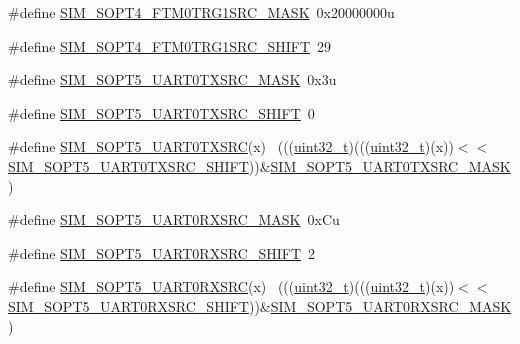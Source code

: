 \begin{DoxyCompactItemize}
\item 
\#define \hyperlink{group___s_i_m___register___masks_ga427b99978dda3f6bf1c0a97559315276}{S\+I\+M\+\_\+\+S\+O\+P\+T4\+\_\+\+F\+T\+M0\+T\+R\+G1\+S\+R\+C\+\_\+\+M\+A\+SK}~0x20000000u
\item 
\#define \hyperlink{group___s_i_m___register___masks_gacf67b2d7908669c38dfb06eff3c7fa8a}{S\+I\+M\+\_\+\+S\+O\+P\+T4\+\_\+\+F\+T\+M0\+T\+R\+G1\+S\+R\+C\+\_\+\+S\+H\+I\+FT}~29
\item 
\#define \hyperlink{group___s_i_m___register___masks_ga11646c1292cb7aab3128e1e563847e32}{S\+I\+M\+\_\+\+S\+O\+P\+T5\+\_\+\+U\+A\+R\+T0\+T\+X\+S\+R\+C\+\_\+\+M\+A\+SK}~0x3u
\item 
\#define \hyperlink{group___s_i_m___register___masks_ga0220b88df4a0747579d24b77f4db4e67}{S\+I\+M\+\_\+\+S\+O\+P\+T5\+\_\+\+U\+A\+R\+T0\+T\+X\+S\+R\+C\+\_\+\+S\+H\+I\+FT}~0
\item 
\#define \hyperlink{group___s_i_m___register___masks_gaae8f435ecf7230b287a09bcb1bad59e0}{S\+I\+M\+\_\+\+S\+O\+P\+T5\+\_\+\+U\+A\+R\+T0\+T\+X\+S\+RC}(x)                                ~(((\hyperlink{_p_e___types_8h_a33594304e786b158f3fb30289278f5af}{uint32\+\_\+t})(((\hyperlink{_p_e___types_8h_a33594304e786b158f3fb30289278f5af}{uint32\+\_\+t})(x))$<$$<$\hyperlink{group___s_i_m___register___masks_ga0220b88df4a0747579d24b77f4db4e67}{S\+I\+M\+\_\+\+S\+O\+P\+T5\+\_\+\+U\+A\+R\+T0\+T\+X\+S\+R\+C\+\_\+\+S\+H\+I\+FT}))\&\hyperlink{group___s_i_m___register___masks_ga11646c1292cb7aab3128e1e563847e32}{S\+I\+M\+\_\+\+S\+O\+P\+T5\+\_\+\+U\+A\+R\+T0\+T\+X\+S\+R\+C\+\_\+\+M\+A\+SK})
\item 
\#define \hyperlink{group___s_i_m___register___masks_ga6160de3cd4b7169ac9095c0d0eee46f7}{S\+I\+M\+\_\+\+S\+O\+P\+T5\+\_\+\+U\+A\+R\+T0\+R\+X\+S\+R\+C\+\_\+\+M\+A\+SK}~0x\+Cu
\item 
\#define \hyperlink{group___s_i_m___register___masks_ga27e87f2f792b880bd156907ab20e9910}{S\+I\+M\+\_\+\+S\+O\+P\+T5\+\_\+\+U\+A\+R\+T0\+R\+X\+S\+R\+C\+\_\+\+S\+H\+I\+FT}~2
\item 
\#define \hyperlink{group___s_i_m___register___masks_gae1482daef7671b82d865a1cefd37c8de}{S\+I\+M\+\_\+\+S\+O\+P\+T5\+\_\+\+U\+A\+R\+T0\+R\+X\+S\+RC}(x)                                ~(((\hyperlink{_p_e___types_8h_a33594304e786b158f3fb30289278f5af}{uint32\+\_\+t})(((\hyperlink{_p_e___types_8h_a33594304e786b158f3fb30289278f5af}{uint32\+\_\+t})(x))$<$$<$\hyperlink{group___s_i_m___register___masks_ga27e87f2f792b880bd156907ab20e9910}{S\+I\+M\+\_\+\+S\+O\+P\+T5\+\_\+\+U\+A\+R\+T0\+R\+X\+S\+R\+C\+\_\+\+S\+H\+I\+FT}))\&\hyperlink{group___s_i_m___register___masks_ga6160de3cd4b7169ac9095c0d0eee46f7}{S\+I\+M\+\_\+\+S\+O\+P\+T5\+\_\+\+U\+A\+R\+T0\+R\+X\+S\+R\+C\+\_\+\+M\+A\+SK})

\end{DoxyCompactItemize}
